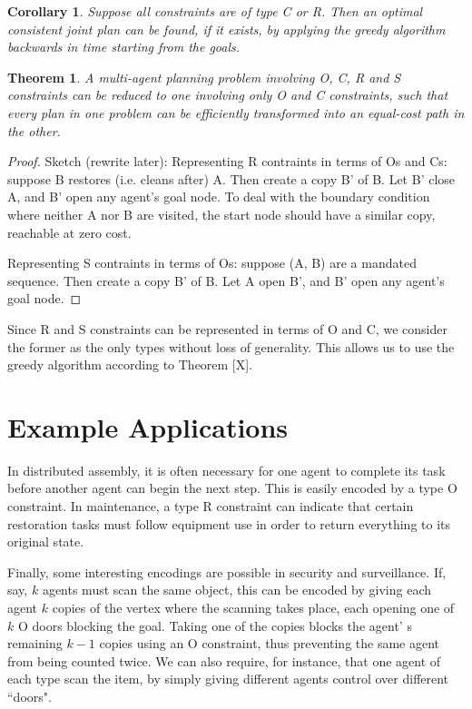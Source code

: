 \documentclass[letterpaper]{article}
\newtheorem{thm}{Theorem}
\newtheorem{cor}{Corollary}
\begin{document}
\begin{cor}
Suppose all constraints are of type C or R. Then an optimal consistent joint plan can be found, if it exists, by applying the greedy algorithm backwards in time starting from the goals.
\end{cor}

\begin{thm} A multi-agent planning problem involving O, C, R and S constraints can be reduced to one involving only O and C constraints, such that every plan in one problem can be efficiently transformed into an equal-cost path in the other.
\end{thm}

\begin{proof}
Sketch (rewrite later): Representing R contraints in terms of Os and Cs: suppose B restores (i.e. cleans after) A. Then create a copy B' of B. Let B' close A, and B' open any agent's goal node. To deal with the boundary condition where neither A nor B are visited, the start node should have a similar copy, reachable at zero cost.

Representing S contraints in terms of Os: suppose (A, B) are a mandated sequence. Then create a copy B' of B. Let A open B', and B' open any agent's goal node.
\end{proof}

Since R and S constraints can be represented in terms of O and C, we consider the former as the only types without loss of generality. This allows us to use the greedy algorithm according to Theorem [X].

\section{Example Applications}

In distributed assembly, it is often necessary for one agent to complete its task before another agent can begin the next step. This is easily encoded by a type O constraint. In maintenance, a type R constraint can indicate that certain restoration tasks must follow equipment use in order to return everything to its original state.

Finally, some interesting encodings are possible in security and surveillance. If, say, $k$ agents must scan the same object, this can be encoded by giving each agent $k$ copies of the vertex where the scanning takes place, each opening one of $k$ O doors blocking the goal. Taking one of the copies blocks the agent' s remaining $k-1$ copies using an O constraint, thus preventing the same agent from being counted twice. We can also require, for instance, that one agent of each type scan the item, by simply giving different agents control over different ``doors".
\end{document}
